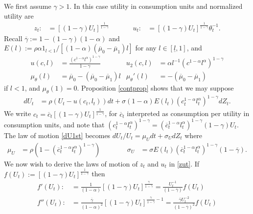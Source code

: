 \documentclass[11pt]{article}
\theoremstyle{plain}
\begin{document}
We first assume $\gamma>1$. In this case utility in consumption units and normalized utility are 
\begin{equation}
\begin{aligned}
z_t : & = [(1-\gamma)U_t]^{\frac{1}{1-\overline{\gamma}}} \ \ \ \ \ \ & \ \ \ \ \ \ 
u_t : & = [(1-\gamma)U_t]^{\frac{1}{1-\overline{\gamma}}}\theta_t^{-1}.
\end{aligned}
\label{zut}
\end{equation} 
Recall $\overline{\gamma} := 1 - (1-\gamma)(1-\alpha)$ and $E(l) := \rho\alpha 1_{l<1}/[(1-\alpha)(\overline{\mu}_0 - \overline{\mu}_1)l]$ for any $l \in [\underline{l},1]$, and
\begin{align*}
u(c,l) & = \frac{{\left(c^{1-\alpha}l^{\alpha} \right)}^{1-\gamma}}{1-\gamma} &
u_2(c,l) & = \alpha l^{-1} {\left(c^{1-\alpha}l^{\alpha} \right)}^{1-\gamma} 
\\ \mu_{\theta}(l) & = \overline{\mu}_0 - (\overline{\mu}_0-\overline{\mu}_1)l &
\mu_{\theta}'(l) & = - (\overline{\mu}_0-\overline{\mu}_1)
\end{align*} 
if $l<1$, and $\mu_{\theta}(1) = 0$. Proposition \ref{contprop} shows that we may suppose
\begin{equation}
\begin{aligned}
dU_t & = \rho{\left(U_t - u(c_t,l_t)\right)}dt + \sigma (1-\alpha)E(l_t) {\left(c_t^{1-\alpha}l_t^\alpha\right)}^{1-\gamma}dZ_t.
\end{aligned}
\label{dU1st}
\end{equation} %
We write $c_t = \overline{c}_t[(1-\gamma)U_t]^{\frac{1}{1-\overline{\gamma}}}$, for $\overline{c}_t$ interpreted as consumption per utility in consumption units, and note that $(c_t^{1-\alpha}l_t^{\alpha})^{1-\gamma} = (\overline{c}_t^{1-\alpha}l_t^{\alpha})^{1-\gamma}(1-\gamma)U_t$. The law of motion \eqref{dU1st} becomes $dU_t/U_t = \mu_Udt + \sigma_UdZ_t$ where 
\begin{equation}
\begin{aligned}
\mu_U & = \rho{\left(1 - (\overline{c}_t^{1-\alpha}l_t^{\alpha})^{1-\gamma}\right)} \ \ \ \ \ \ \ & \ \ \ \ \ \ \ 
\sigma_U & = \sigma E(l_t)(\overline{c}_t^{1-\alpha}l_t^{\alpha})^{1-\gamma}(1-\overline{\gamma}).
\end{aligned}
\label{muUsigU}
\end{equation} 
We now wish to derive the laws of motion of $z_t$ and $u_t$ in \eqref{zut}. If $f(U_t) := [(1 - \gamma)U_t]^{\frac{1}{1-\overline{\gamma}}}$ then
\begin{align*}
f'(U_t) : & = \frac{1}{(1-\alpha)}[(1 - \gamma)U_t]^{\frac{\overline{\gamma}}{1-\overline{\gamma}}}
 = \frac{U_t^{-1}}{(1-\overline{\gamma})}f(U_t)
\\ f''(U_t) : & = \frac{\overline{\gamma}}{(1-\alpha)^2}[(1 - \gamma)U_t]^{\frac{\overline{\gamma}}{1-\overline{\gamma}}-1}
= \frac{\overline{\gamma}U_t^{-2}}{(1-\overline{\gamma})^2}f(U_t)
\end{align*} %
\end{document}
